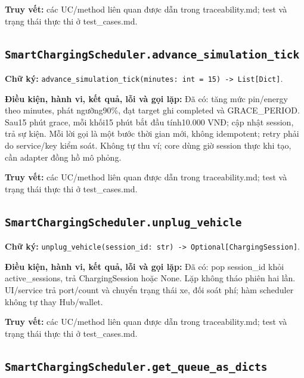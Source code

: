 \documentclass[11pt,a4paper]{article}
\begin{document}
\textbf{Truy vết:} các UC/method liên quan được dẫn trong
traceability.md; test và trạng thái thực thi ở test\_cases.md.

\hypertarget{smartchargingscheduler.advance_simulation_tick}{%
\subsection{\texorpdfstring{\texttt{SmartChargingScheduler.advance\_simulation\_tick}}{SmartChargingScheduler.advance\_simulation\_tick}}\label{smartchargingscheduler.advance_simulation_tick}}

\textbf{Chữ ký:}
\texttt{advance\_simulation\_tick(minutes:\ int\ =\ 15)\ -\textgreater{}\ List{[}Dict{]}}.

\textbf{Điều kiện, hành vi, kết quả, lỗi và gọi lặp:} Đã có: tăng mức
pin/energy theo minutes, phát ngưỡng90\%, đạt target ghi completed và
GRACE\_PERIOD. Sau15 phút grace, mỗi khối15 phút bắt đầu tính10.000 VNĐ;
cập nhật session, trả sự kiện. Mỗi lời gọi là một bước thời gian mới,
không idempotent; retry phải do service/key kiểm soát. Không tự thu ví;
core dùng giờ session thực khi tạo, cần adapter đồng hồ mô phỏng.

\textbf{Truy vết:} các UC/method liên quan được dẫn trong
traceability.md; test và trạng thái thực thi ở test\_cases.md.

\hypertarget{smartchargingscheduler.unplug_vehicle}{%
\subsection{\texorpdfstring{\texttt{SmartChargingScheduler.unplug\_vehicle}}{SmartChargingScheduler.unplug\_vehicle}}\label{smartchargingscheduler.unplug_vehicle}}

\textbf{Chữ ký:}
\texttt{unplug\_vehicle(session\_id:\ str)\ -\textgreater{}\ Optional{[}ChargingSession{]}}.

\textbf{Điều kiện, hành vi, kết quả, lỗi và gọi lặp:} Đã có: pop
session\_id khỏi active\_sessions, trả ChargingSession hoặc None. Lặp
không tháo phiên hai lần. UI/service trả port/count và chuyển trạng thái
xe, đối soát phí; hàm scheduler không tự thay Hub/wallet.

\textbf{Truy vết:} các UC/method liên quan được dẫn trong
traceability.md; test và trạng thái thực thi ở test\_cases.md.

\hypertarget{smartchargingscheduler.get_queue_as_dicts}{%
\subsection{\texorpdfstring{\texttt{SmartChargingScheduler.get\_queue\_as\_dicts}}{SmartChargingScheduler.get\_queue\_as\_dicts}}\label{smartchargingscheduler.get_queue_as_dicts}}
\end{document}
